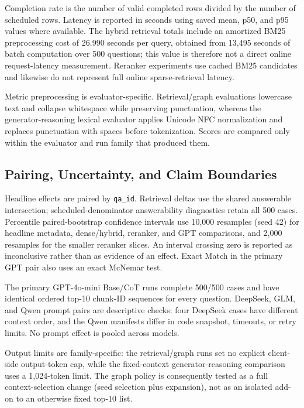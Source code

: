 Completion rate is the number of valid completed rows divided by the number of scheduled rows. Latency is reported in seconds using saved mean, p50, and p95 values where available. The hybrid retrieval totals include an amortized BM25 preprocessing cost of 26.990 seconds per query, obtained from 13,495 seconds of batch computation over 500 questions; this value is therefore not a direct online request-latency measurement. Reranker experiments use cached BM25 candidates and likewise do not represent full online sparse-retrieval latency.

Metric preprocessing is evaluator-specific. Retrieval/graph evaluations lowercase text and collapse whitespace while preserving punctuation, whereas the generator-reasoning lexical evaluator applies Unicode NFC normalization and replaces punctuation with spaces before tokenization. Scores are compared only within the evaluator and run family that produced them.

\subsection{Pairing, Uncertainty, and Claim Boundaries}
\label{sec:experimental-protocol}

Headline effects are paired by \texttt{qa\_id}. Retrieval deltas use the
shared answerable intersection; scheduled-denominator answerability
diagnostics retain all 500 cases. Percentile paired-bootstrap confidence
intervals use 10,000 resamples (seed 42) for headline metadata,
dense/hybrid, reranker, and GPT comparisons, and 2,000 resamples for the
smaller reranker slices. An interval crossing zero is reported as
inconclusive rather than as evidence of an effect. Exact Match in the primary
GPT pair also uses an exact McNemar test.

The primary GPT-4o-mini Base/CoT runs complete 500/500 cases and have
identical ordered top-10 chunk-ID sequences for every question. DeepSeek,
GLM, and Qwen prompt pairs are descriptive checks: four DeepSeek cases have
different context order, and the Qwen manifests differ in code snapshot,
timeouts, or retry limits. No prompt effect is pooled across models.

Output limits are family-specific: the retrieval/graph runs set no explicit
client-side output-token cap, while the fixed-context generator-reasoning
comparison uses a 1,024-token limit. The graph policy is consequently tested
as a full context-selection change (seed selection plus expansion), not as an
isolated add-on to an otherwise fixed top-10 list.

